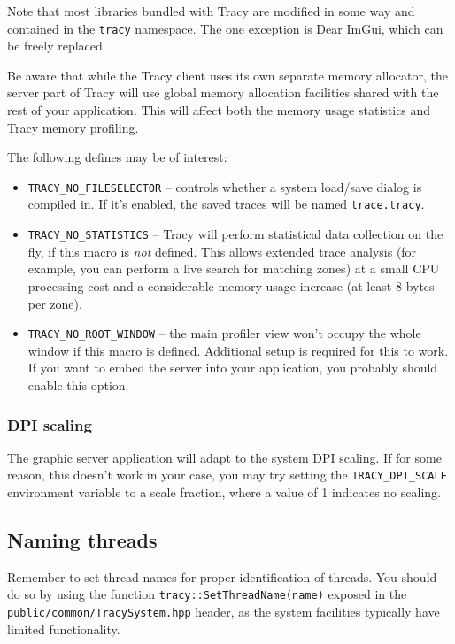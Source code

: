 \documentclass[hidelinks,titlepage,a4paper]{article}
\begin{document}
Note that most libraries bundled with Tracy are modified in some way and contained in the \texttt{tracy} namespace. The one exception is Dear ImGui, which can be freely replaced.

Be aware that while the Tracy client uses its own separate memory allocator, the server part of Tracy will use global memory allocation facilities shared with the rest of your application. This will affect both the memory usage statistics and Tracy memory profiling.

The following defines may be of interest:

\begin{itemize}
\item \texttt{TRACY\_NO\_FILESELECTOR} -- controls whether a system load/save dialog is compiled in. If it's enabled, the saved traces will be named \texttt{trace.tracy}.
\item \texttt{TRACY\_NO\_STATISTICS} -- Tracy will perform statistical data collection on the fly, if this macro is \emph{not} defined. This allows extended trace analysis (for example, you can perform a live search for matching zones) at a small CPU processing cost and a considerable memory usage increase (at least 8 bytes per zone).
\item \texttt{TRACY\_NO\_ROOT\_WINDOW} -- the main profiler view won't occupy the whole window if this macro is defined. Additional setup is required for this to work. If you want to embed the server into your application, you probably should enable this option.
\end{itemize}

\subsubsection{DPI scaling}

The graphic server application will adapt to the system DPI scaling. If for some reason, this doesn't work in your case, you may try setting the \texttt{TRACY\_DPI\_SCALE} environment variable to a scale fraction, where a value of 1 indicates no scaling.

\subsection{Naming threads}
\label{namingthreads}

Remember to set thread names for proper identification of threads. You should do so by using the function \texttt{tracy::SetThreadName(name)} exposed in the \texttt{public/common/TracySystem.hpp} header, as the system facilities typically have limited functionality.
\end{document}
